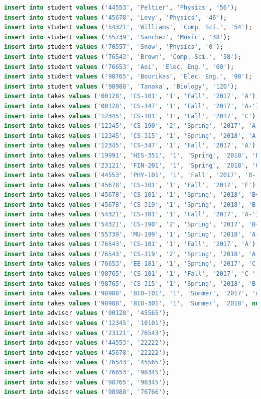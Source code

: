 \documentclass{article}
\begin{document}
\begin{lstlisting}[language=sql]
insert into student values ('44553', 'Peltier', 'Physics', '56');
insert into student values ('45678', 'Levy', 'Physics', '46');
insert into student values ('54321', 'Williams', 'Comp. Sci.', '54');
insert into student values ('55739', 'Sanchez', 'Music', '38');
insert into student values ('70557', 'Snow', 'Physics', '0');
insert into student values ('76543', 'Brown', 'Comp. Sci.', '58');
insert into student values ('76653', 'Aoi', 'Elec. Eng.', '60');
insert into student values ('98765', 'Bourikas', 'Elec. Eng.', '98');
insert into student values ('98988', 'Tanaka', 'Biology', '120');
insert into takes values ('00128', 'CS-101', '1', 'Fall', '2017', 'A');
insert into takes values ('00128', 'CS-347', '1', 'Fall', '2017', 'A-');
insert into takes values ('12345', 'CS-101', '1', 'Fall', '2017', 'C');
insert into takes values ('12345', 'CS-190', '2', 'Spring', '2017', 'A');
insert into takes values ('12345', 'CS-315', '1', 'Spring', '2018', 'A');
insert into takes values ('12345', 'CS-347', '1', 'Fall', '2017', 'A');
insert into takes values ('19991', 'HIS-351', '1', 'Spring', '2018', 'B');
insert into takes values ('23121', 'FIN-201', '1', 'Spring', '2018', 'C+');
insert into takes values ('44553', 'PHY-101', '1', 'Fall', '2017', 'B-');
insert into takes values ('45678', 'CS-101', '1', 'Fall', '2017', 'F');
insert into takes values ('45678', 'CS-101', '1', 'Spring', '2018', 'B+');
insert into takes values ('45678', 'CS-319', '1', 'Spring', '2018', 'B');
insert into takes values ('54321', 'CS-101', '1', 'Fall', '2017', 'A-');
insert into takes values ('54321', 'CS-190', '2', 'Spring', '2017', 'B+');
insert into takes values ('55739', 'MU-199', '1', 'Spring', '2018', 'A-');
insert into takes values ('76543', 'CS-101', '1', 'Fall', '2017', 'A');
insert into takes values ('76543', 'CS-319', '2', 'Spring', '2018', 'A');
insert into takes values ('76653', 'EE-181', '1', 'Spring', '2017', 'C');
insert into takes values ('98765', 'CS-101', '1', 'Fall', '2017', 'C-');
insert into takes values ('98765', 'CS-315', '1', 'Spring', '2018', 'B');
insert into takes values ('98988', 'BIO-101', '1', 'Summer', '2017', 'A');
insert into takes values ('98988', 'BIO-301', '1', 'Summer', '2018', null);
insert into advisor values ('00128', '45565');
insert into advisor values ('12345', '10101');
insert into advisor values ('23121', '76543');
insert into advisor values ('44553', '22222');
insert into advisor values ('45678', '22222');
insert into advisor values ('76543', '45565');
insert into advisor values ('76653', '98345');
insert into advisor values ('98765', '98345');
insert into advisor values ('98988', '76766');

\end{lstlisting}
\end{document}

